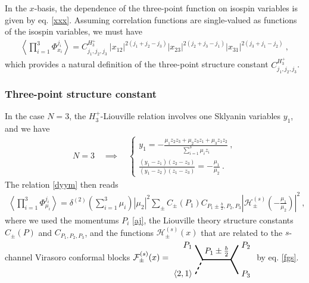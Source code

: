 \documentclass[12pt, a4paper, notitlepage, twoside]{report}
\numberwithin{equation}{section}
\theoremstyle{break}
\begin{document}
In the $x$-basis, the dependence of the three-point function on isospin variables is given by eq. \eqref{xxx}.
Assuming correlation functions are single-valued as functions of the isospin variables, we must have
\begin{align}
  \left\langle \prod_{i=1}^3 \Phi^{j_i}_{x_i} \right\rangle = C^{H_3^+}_{j_1,j_2,j_3}\ |x_{12}|^{2(j_1+j_2-j_3)} |x_{23}|^{2(j_2+j_3-j_1)} |x_{31}|^{2(j_3+j_1-j_2)}\ ,
\label{ch}
\end{align}
which provides a natural definition of the three-point structure constant $C^{H_3^+}_{j_1,j_2,j_3}$.

\subsubsection{Three-point structure constant}

In the case $N=3$, the $H_3^+$-Liouville relation involves one Sklyanin variables $y_1$, and we have
\begin{align}
 N=3 \quad \implies \quad  \left\{\begin{array}{l} y_1 = -\frac{\mu_1z_2z_3+\mu_2z_3z_1+\mu_3z_1z_2}{\sum_{i=1}^3\mu_iz_i}\ , \\ \frac{(y_1-z_1)(z_2-z_3)}{(y_1-z_2)(z_1-z_3)} = -\frac{\mu_1}{\mu_2}\ . \end{array}\right.
\end{align}
The relation \eqref{dyym} then reads 
\begin{align}
 \left\langle \prod_{i=1}^3\Phi^{j_i}_{\mu_i} \right\rangle = \delta^{(2)}(\textstyle{\sum}_{i=1}^3\mu_i) |\mu_2|^2 \sum_\pm C_\pm(P_1)C_{P_1\pm\frac{b}{2},P_2,P_3} \left|\mathcal{H}^{(s)}_\pm(-\tfrac{\mu_1}{\mu_2})  \right|^2\ , 
\label{sfpm}
\end{align}
where we used the momentums $P_i$ \eqref{aj}, the Liouville theory structure constants $C_\pm(P)$ and $C_{P_1,P_2,P_3}$, and the functions $\mathcal{H}^{(s)}_\pm(x)$ that are related to the 
$s$-channel Virasoro conformal blocks  
$
 \mathcal{F}^{(s)}_\pm(x)  =  
\begin{tikzpicture}[baseline=(current  bounding  box.center), very thick, scale = .3]
\draw (-1,2) node [left] {$P_1$} -- (0,0) -- node [above] {$P_1\pm \frac{b}{2}$} (4,0) -- (5,2) node [right] {$P_2$};
\draw[dashed] (-1,-2) node [left] {$\langle 2,1 \rangle$} -- (0,0);
\draw (4,0) -- (5,-2) node [right] {$P_3$};
\end{tikzpicture}
$
by eq. \eqref{fgs}. 
\end{document}
